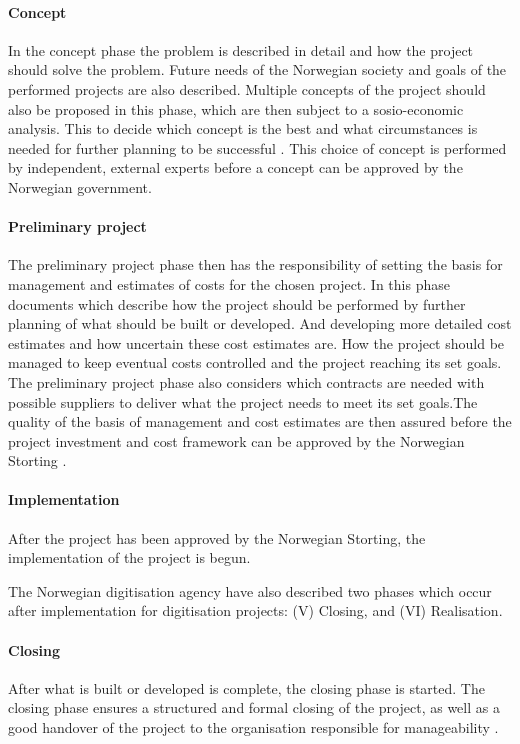 \paragraph{Concept}
In the concept phase the problem is described in detail and how the project should solve the problem. Future needs of the Norwegian society and goals of the performed projects are also described. Multiple concepts of the project should also be proposed in this phase, which are then subject to a sosio-economic analysis. This to decide which concept is the best and what circumstances is needed for further planning to be successful \cite{project_wizard_r_2019}. This choice of concept is performed by independent, external experts before a concept can be approved by the Norwegian government.

\paragraph{Preliminary project}
The preliminary project phase then has the responsibility of setting the basis for management and estimates of costs for the chosen project. In this phase documents which describe how the project should be performed by further planning of what should be built or developed. And developing more detailed cost estimates and how uncertain these cost estimates are. How the project should be managed to keep eventual costs controlled and the project reaching its set goals. The preliminary project phase also considers which contracts are needed with possible suppliers to deliver what the project needs to meet its set goals.The quality of the basis of management and cost estimates are then assured before the project investment and cost framework can be approved by the Norwegian Storting \cite{project_wizard_r_2019}. 

\paragraph{Implementation}
After the project has been approved by the Norwegian Storting, the implementation of the project is begun.

The Norwegian digitisation agency have also described two phases which occur after implementation for digitisation projects: (V) Closing, and (VI) Realisation.

\paragraph{Closing}
After what is built or developed is complete, the closing phase is started. The closing phase ensures a structured and formal closing of the project, as well as a good handover of the project to the organisation responsible for manageability \cite{project_wizard_digdir_2023}. 

